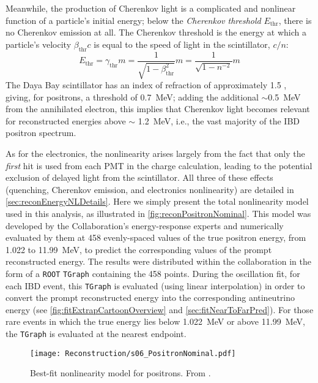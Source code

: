 \documentclass[../thesis.tex]{subfiles}
\begin{document}
Meanwhile, the production of Cherenkov light is a complicated and nonlinear function of a particle's initial energy; below the \emph{Cherenkov threshold} $E_{\mathrm{thr}}$, there is no Cherenkov emission at all. The Cherenkov threshold is the energy at which a particle's velocity $\beta_{\mathrm{thr}} c$ is equal to the speed of light in the scintillator, $c/n$:
\begin{equation}
  E_{\mathrm{thr}} = \gamma_{\mathrm{thr}} m = \frac{1}{\sqrt{1 - \beta^2_{\mathrm{thr}}}} m = \frac{1}{\sqrt{1 - n^{-2}}} m
\end{equation}
The Daya Bay scintillator has an index of refraction of approximately 1.5 \cite{Band:2012dh}, giving, for positrons, a threshold of 0.7~MeV; adding the additional $\sim$0.5~MeV from the annihilated electron, this implies that Cherenkov light becomes relevant for reconstructed energies above $\sim$ 1.2~MeV, i.e., the vast majority of the IBD positron spectrum.

As for the electronics, the nonlinearity arises largely from the fact that only the \emph{first} hit is used from each PMT in the charge calculation, leading to the potential exclusion of delayed light from the scintillator. All three of these effects (quenching, Cherenkov emission, and electronics nonlinearity) are detailed in \autoref{sec:reconEnergyNLDetails}. Here we simply present the total nonlinearity model used in this analysis, as illustrated in \autoref{fig:reconPositronNominal}. This model was developed by the Collaboration's energy-response experts and numerically evaluated by them at 458 evenly-spaced values of the true positron energy, from 1.022 to 11.99~MeV, to predict the corresponding values of the prompt reconstructed energy. The results were distributed within the collaboration in the form of a \texttt{ROOT} \texttt{TGraph} containing the 458 points. During the oscillation fit, for each IBD event, this \texttt{TGraph} is evaluated (using linear interpolation) in order to convert the prompt reconstructed energy into the corresponding antineutrino energy (see \autoref{fig:fitExtrapCartoonOverview} and \autoref{sec:fitNearToFarPred}). For those rare events in which the true energy lies below 1.022~MeV or above 11.99~MeV, the \texttt{TGraph} is evaluated at the nearest endpoint.

\begin{figure}[h]
  \texttt{[image: Reconstruction/s06\_PositronNominal.pdf]}
  \caption{Best-fit nonlinearity model for positrons. From \cite{NonlinearityPaper}.}
  \label{fig:reconPositronNominal}
\end{figure}
\end{document}
